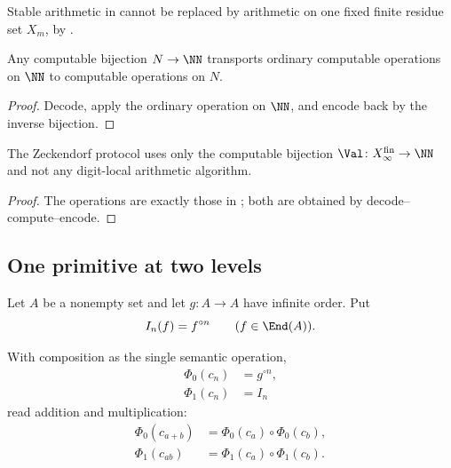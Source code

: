 Stable arithmetic in  cannot be replaced by arithmetic on one
fixed finite residue set \(X_m\), by .

\begin{lemma}
\label{lem:value-transported-suffices}
Any computable bijection \(N\to\NN\) transports ordinary computable operations on
\(\NN\) to computable operations on \(N\).
\end{lemma}

\begin{proof}
Decode, apply the ordinary operation on \(\NN\), and encode back by the inverse
bijection.
\end{proof}

\begin{proposition}
\label{prop:value-transport-exact-interface}
The Zeckendorf protocol uses only the computable bijection
\(\Val\colon X_\infty^{\mathrm{fin}}\to\NN\) and not any digit-local arithmetic
algorithm.
\end{proposition}

\begin{proof}
The operations are exactly those in ; both are obtained by
decode--compute--encode.
\end{proof}

\subsection{One primitive at two levels}\label{ssec:sole}

Let \(A\) be a nonempty set and let \(g\colon A\to A\) have infinite order.  Put
\[
  I_n(f)=f^{\circ n}\qquad(f\in\End(A)).
\]

\begin{theorem}
\label{thm:two-level}
With composition as the single semantic operation,
\begin{align}
  \Phi_0(c_n)&=g^{\circ n},\label{eq:level0}\\
  \Phi_1(c_n)&=I_n\label{eq:level1}
\end{align}
read addition and multiplication:
\begin{align}
  \Phi_0(c_{a+b})&=\Phi_0(c_a)\circ\Phi_0(c_b),\label{eq:add-from-comp}\\
  \Phi_1(c_{ab})&=\Phi_1(c_a)\circ\Phi_1(c_b).\label{eq:mul-from-comp}
\end{align}
\end{theorem}


